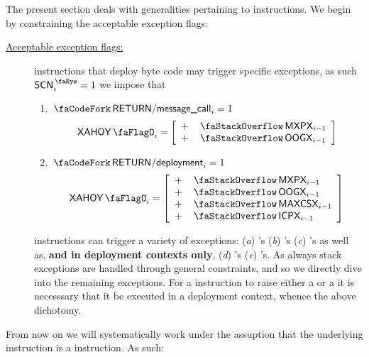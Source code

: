 The present section deals with generalities pertaining to  instructions.
We begin by constraining the acceptable exception flags:
\begin{description}
	\item[\underline{Acceptable exception flags:}]
		 instructions that deploy byte code may trigger specific exceptions, as such
		\If $\peekScenario_{i} = 1$ \Then we impose that
		\begin{enumerate}
			\item \If $\scenReturnFromMessageCall _{i} = 1$ \Then
				\[
					\xAhoy_{i}
					= 
					\left[ \begin{array}{cl}
						+ & \stackMxpx _{i - 1} \\
						+ & \stackOogx _{i - 1} \\
					\end{array} \right]
				\]
			\item \If $\scenReturnFromDeployment _{i} = 1$ \Then
				\[
					\xAhoy_{i}
					= 
					\left[ \begin{array}{cl}
						+ & \stackMxpx   _{i - 1} \\
						+ & \stackOogx   _{i - 1} \\
						+ & \stackMaxcsx _{i - 1} \\
						+ & \stackIcpx   _{i - 1} \\
					\end{array} \right]
				\]
		\end{enumerate}
		\saNote{}  instructions can trigger a variety of exceptions:
		(\emph{a}) \suxSH{}'s
		(\emph{b}) \mxpxSH{}'s
		(\emph{c}) \oogxSH{}'s
		as well as, \textbf{and in deployment contexts only},
		(\emph{d}) \maxcsxSH{}'s
		(\emph{e}) \icpxSH{}'s.
		As always stack exceptions are handled through general constraints, and so we directly dive into the remaining exceptions.
		For a  instruction to raise either a \maxcsxSH{} or a \icpxSH{} it is necesssary that it be executed in a deployment context, whence the above dichotomy.
\end{description}
From now on we will systematically work under the assuption that the underlying instruction is a  instruction.
As such:
\begin{center}
\end{center}
